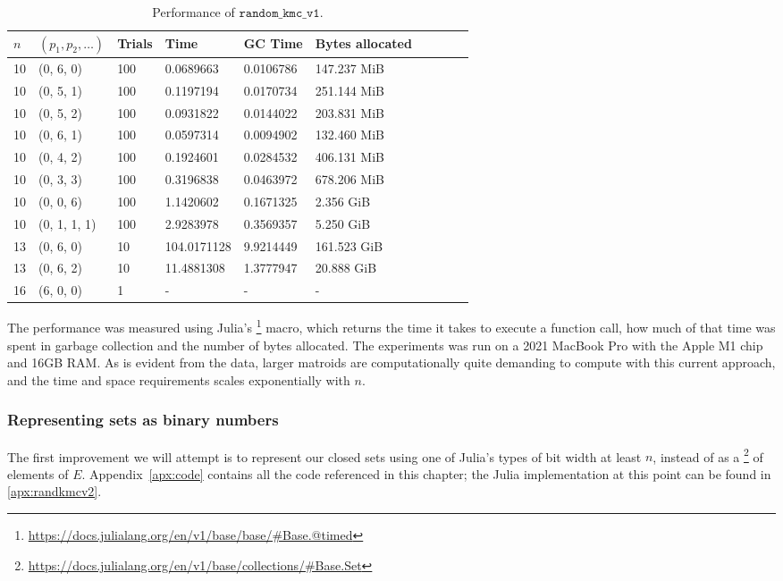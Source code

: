 \begin{table}[ht!]
  \centering
    \begin{tabular}{llllllllll}
      \toprule
      $n$ & $(p_1, p_2, \ldots)$ & Trials & Time  & GC Time & Bytes allocated \\
      \midrule
        10 & (0, 6, 0)    & 100 & 0.0689663   & 0.0106786 & 147.237 MiB \\
        10 & (0, 5, 1)    & 100 & 0.1197194   & 0.0170734 & 251.144 MiB \\
        10 & (0, 5, 2)    & 100 & 0.0931822   & 0.0144022 & 203.831 MiB \\
        10 & (0, 6, 1)    & 100 & 0.0597314   & 0.0094902 & 132.460 MiB \\
        10 & (0, 4, 2)    & 100 & 0.1924601   & 0.0284532 & 406.131 MiB \\
        10 & (0, 3, 3)    & 100 & 0.3196838   & 0.0463972 & 678.206 MiB \\
        10 & (0, 0, 6)    & 100 & 1.1420602   & 0.1671325 & 2.356 GiB   \\
        10 & (0, 1, 1, 1) & 100 & 2.9283978   & 0.3569357 & 5.250 GiB   \\
        13 & (0, 6, 0)    & 10  & 104.0171128 & 9.9214449 & 161.523 GiB \\
        13 & (0, 6, 2)    & 10  & 11.4881308  & 1.3777947 & 20.888 GiB  \\
        16 & (6, 0, 0)    & 1   & -           & -         & -           \\
      \bottomrule
    \end{tabular}
  \caption{Performance of $\texttt{random\_kmc\_v1}$.}
  \label{tab:perf_v1}
\end{table}

The performance was measured using Julia's \footnote{\href{https://docs.julialang.org/en/v1/base/base/\#Base.@timed}{https://docs.julialang.org/en/v1/base/base/\#Base.@timed}} macro, which returns the time it takes to execute a function call, how much of that time was spent in garbage collection and the number of bytes allocated. The experiments was run on a 2021 MacBook Pro with the Apple M1 chip and 16GB RAM. As is evident from the data, larger matroids are computationally quite demanding to compute with this current approach, and the time and space requirements scales exponentially with $n$.

\subsubsection{Representing sets as binary numbers}
The first improvement we will attempt is to represent our closed sets using one of Julia's  types of bit width at least $n$, instead of as a \footnote{\href{https://docs.julialang.org/en/v1/base/collections/\#Base.Set}{https://docs.julialang.org/en/v1/base/collections/\#Base.Set}} of elements of $E$. Appendix~\ref{apx:code} contains all the code referenced in this chapter; the Julia implementation at this point can be found in \ref{apx:randkmcv2}. 

